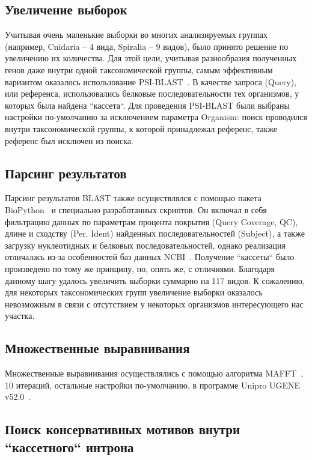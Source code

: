 \subsection{Увеличение выборок}

Учитывая очень маленькие выборки во многих анализируемых группах (например, Cnidaria – 4 вида, Spiralia – 9 видов), было принято решение по увеличению их количества.
Для этой цели, учитывая разнообразия полученных генов даже внутри одной таксономической группы, самым эффективным вариантом оказалось использование PSI-BLAST~\cite{psi_blast}.
В качестве запроса (Query), или референса, использовались белковые последовательности тех организмов, у которых была найдена ``кассета``.
Для проведения PSI-BLAST были выбраны настройки по-умолчанию за исключением параметра Organism: поиск проводился внутри таксономической группы, к которой принадлежал референс, также референс был исключен из поиска.

\subsection{Парсинг результатов}

Парсинг результатов BLAST также осуществлялся с помощью пакета BioPython~\cite{biopython} и специально разработанных скриптов.
Он включал в себя фильтрацию данных по параметрам процента покрытия (Query Coverage, QC), длине и сходству (Per. Ident) найденных последовательностей (Subject), а также загрузку нуклеотидных и белковых последовательностей, однако реализация отличалась из-за особенностей баз данных NCBI~\cite{ncbi_general}.
Получение ``кассеты`` было произведено по тому же принципу, но, опять же, с отличиями.
Благодаря данному шагу удалось увеличить выборки суммарно на 117 видов.
К сожалению, для некоторых таксономических групп увеличение выборки оказалось невозможным в связи с отсутствием у некоторых организмов интересующего нас участка.

\subsection{Множественные выравнивания}

Множественные выравнивания осуществлялись с помощью алгоритма MAFFT~\cite{mafft}, 10 итераций, остальные настройки по-умолчанию, в программе Unipro UGENE v52.0~\cite{ugene}.

\subsection{Поиск консервативных мотивов внутри ``кассетного`` интрона}

